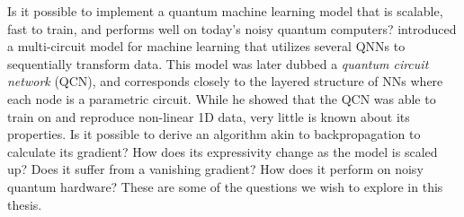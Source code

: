 Is it possible to implement a quantum machine learning model that is scalable, fast to train, and performs well on today's noisy quantum computers? \citet{stian} introduced a multi-circuit model for machine learning that utilizes several QNNs to sequentially transform data. This model was later dubbed a \emph{quantum circuit network} (QCN), and corresponds closely to the layered structure of NNs where each node is a parametric circuit. While he showed that the QCN was able to train on and reproduce non-linear 1D data, very little is known about its properties. Is it possible to derive an algorithm akin to backpropagation to calculate its gradient? How does its expressivity change as the model is scaled up? Does it suffer from a vanishing gradient? How does it perform on noisy quantum hardware? These are some of the questions we wish to explore in this thesis.


